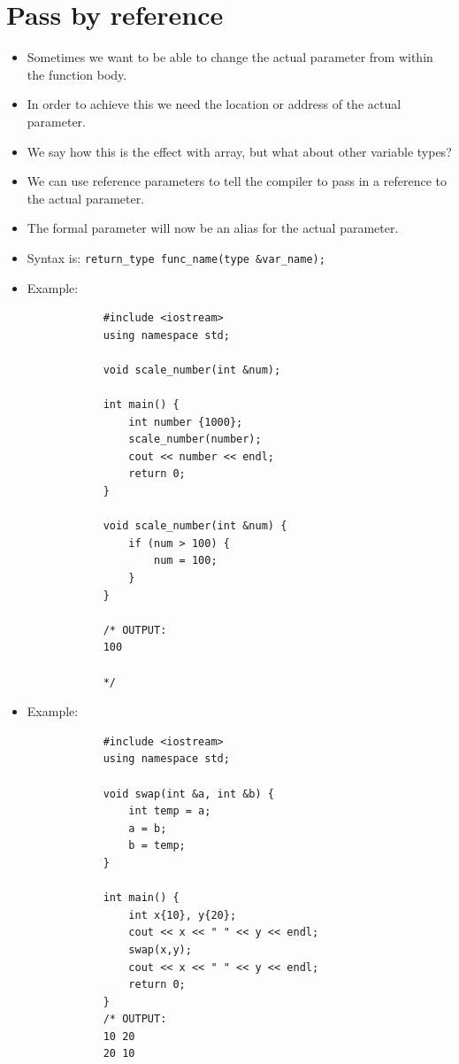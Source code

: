 \section{Pass by reference}
\begin{itemize}
    \item Sometimes we want to be able to change the actual parameter from within the function body.
    \item In order to achieve this we need the location or address of the actual parameter.
    \item We say how this is the effect with array, but what about other variable types?
    \item We can use reference parameters to tell the compiler to pass in a reference to the actual parameter.
    \item The formal parameter will now be an alias for the actual parameter.
    \item Syntax is: \verb|return_type func_name(type &var_name);|
    
    \item Example:
        \begin{verbatim}
            #include <iostream>
            using namespace std;

            void scale_number(int &num);

            int main() {
                int number {1000};
                scale_number(number);
                cout << number << endl;
                return 0;
            }

            void scale_number(int &num) {
                if (num > 100) {
                    num = 100;
                }
            }

            /* OUTPUT:
            100

            */
        \end{verbatim}
    
    \item Example:
        \begin{verbatim}
            #include <iostream>
            using namespace std;

            void swap(int &a, int &b) {
                int temp = a;
                a = b;
                b = temp;
            }

            int main() {
                int x{10}, y{20};
                cout << x << " " << y << endl;
                swap(x,y);
                cout << x << " " << y << endl;
                return 0;
            }
            /* OUTPUT:
            10 20
            20 10


\end{verbatim}
\end{itemize}

